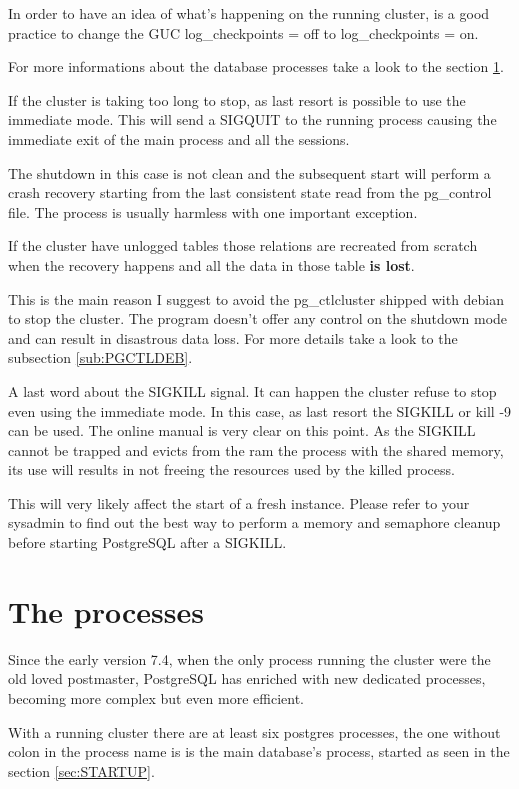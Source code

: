 In order to have an idea  of what's happening on the running cluster, is a good 
practice to change the GUC log\_checkpoints = off to log\_checkpoints = on.


For more informations about the database processes take a look to the section 
\ref{sec:PROCESSES}.

If the cluster is taking too long to stop, as last resort is possible to 
use the immediate mode. This will send a SIGQUIT to the running process causing 
the immediate exit of the main process and all the sessions. 

The shutdown in this case is not clean and the subsequent start will perform a 
crash recovery starting from the last consistent state read from the 
pg\_control file. The process is usually harmless with one important exception.

If the cluster have unlogged tables those relations are recreated from scratch 
when the recovery happens and all the data in those table \textbf{is lost}.

This is the main reason I suggest to avoid the pg\_ctlcluster shipped with 
debian to stop the cluster. The program doesn't offer any control on the 
shutdown mode and can result in disastrous data loss. For more details take a 
look to the subsection \ref{sub:PGCTLDEB}.

A last word about the SIGKILL signal. It can happen the cluster refuse to stop 
even using the immediate mode. In this case, as last resort the SIGKILL or kill 
-9 can be used. The online manual is very clear on this point. As the SIGKILL 
cannot be trapped and evicts from the ram the process with the shared memory, 
its use will results in not freeing the resources used by the killed process.

This will very likely affect the start of a fresh instance. Please refer to 
your sysadmin to find out the best way to perform a memory and semaphore 
cleanup before starting PostgreSQL after a SIGKILL. 


\section{The processes}
\label{sec:PROCESSES}
Since the early version 7.4, when the only process running the cluster were the 
old loved postmaster, PostgreSQL has enriched with new dedicated processes, 
becoming more complex but even more efficient.

With a running cluster there are at least six postgres processes, the one 
without colon in the process name is is the main database's process, started 
as seen in the section \ref{sec:STARTUP}.


